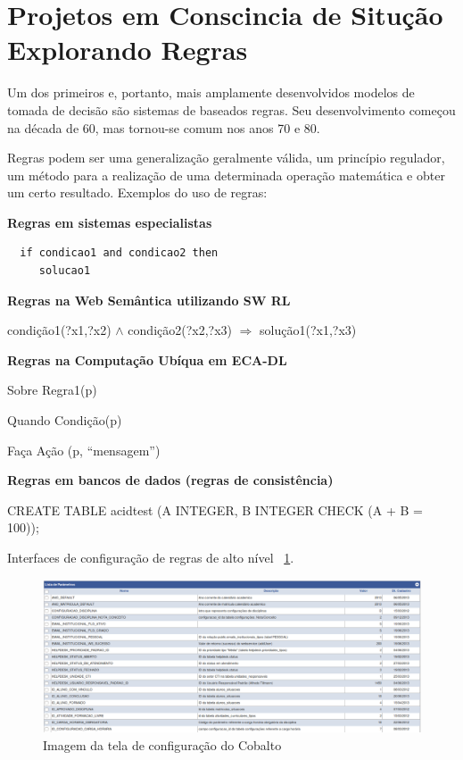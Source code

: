 \documentclass[12pt,a4paper,compsoc]{IEEEtran}
\begin{document}
\section{Projetos em Conscincia de Situção Explorando Regras}

  Um dos primeiros e, portanto, mais amplamente desenvolvidos modelos de tomada de decisão são
  sistemas de baseados regras. Seu  desenvolvimento começou na década de 60, mas tornou-se comum
  nos anos 70 e 80.
  
  Regras podem ser  uma generalização geralmente válida, um princípio regulador, um método para a
  realização de uma determinada  operação matemática e obter um certo resultado. Exemplos do uso de
  regras:
  
  \textbf{Regras em sistemas especialistas}

  \begin{lstlisting}
  if condicao1 and condicao2 then
     solucao1
  \end{lstlisting}
  
  \textbf{Regras na Web Semântica utilizando SW RL}
  
  condição1(?x1,?x2) $\wedge$ condição2(?x2,?x3) $\Rightarrow$ solução1(?x1,?x3)

  \textbf{Regras na Computação Ubíqua em ECA-DL}

  Sobre Regra1(p)
  
  Quando Condição(p)
  
  Faça Ação (p, ``mensagem'')


  \textbf{Regras em bancos de dados (regras de consistência)}
  
  CREATE TABLE acidtest (A INTEGER, B INTEGER CHECK (A + B = 100));
  
  Interfaces de configuração de regras de alto nível  ~\ref{config-cobalto}.

  \begin{figure}[t!]
    \centerline{\includegraphics[scale=.2]{imagens/config-cobalto}}
    \caption{Imagem da tela de configuração do Cobalto}
    \label{config-cobalto}
  \end{figure}
\end{document}
